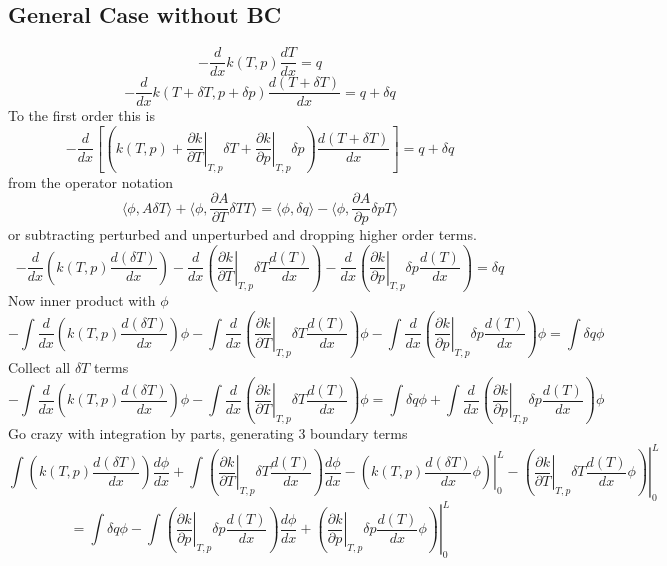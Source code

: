 \documentclass[11pt]{article}
\newcommand{\der}[2]{\frac{\partial #1}{\partial #2}}
\begin{document}
\subsection{General Case without BC}

\[
-\frac{d}{dx}k(T,p)\frac{dT}{dx} = q 
\]
\[
-\frac{d}{dx}k(T+\delta T,p+\delta p)\frac{d(T+\delta T)}{dx} = q +\delta q 
\]
To the first order this is
\[
-\frac{d}{dx}\left[\left(k(T,p)+\left.\frac{\partial k}{\partial T}\right|_{T,p}\delta T+\left.\frac{\partial k}{\partial p}\right|_{T,p}\delta p\right) \frac{d(T+\delta T)}{dx}\right] = q+\delta q \] 
from the operator notation 
\[
\langle \phi , A \delta  T \rangle + \langle \phi, \der{A}{T} \delta T T \rangle = \langle \phi, \delta q \rangle- \langle \phi , \der{A}{p} \delta p T \rangle 
\]
or subtracting perturbed and unperturbed and dropping higher order terms.
\[
-\frac{d}{dx}\left( k(T,p) \frac{d(\delta T)}{dx} \right)
-\frac{d}{dx}\left(\left.\frac{\partial k}{\partial T}\right|_{T,p}\delta T \frac{d(T)}{dx}\right)
-\frac{d}{dx}\left(\left.\frac{\partial k}{\partial p}\right|_{T,p}\delta p \frac{d(T)}{dx} \right)
= \delta q \] 
Now inner product with $\phi$
\[
-\int \frac{d}{dx}\left( k(T,p) \frac{d(\delta T)}{dx} \right)\phi
-\int \frac{d}{dx}\left(\left.\frac{\partial k}{\partial T}\right|_{T,p}\delta T \frac{d(T)}{dx}\right)\phi
-\int \frac{d}{dx}\left(\left.\frac{\partial k}{\partial p}\right|_{T,p}\delta p \frac{d(T)}{dx} \right)\phi
= \int \delta q \phi
\] 
Collect all $\delta T$ terms
\[
-\int \frac{d}{dx}\left( k(T,p) \frac{d(\delta T)}{dx} \right)\phi
-\int \frac{d}{dx}\left(\left.\frac{\partial k}{\partial T}\right|_{T,p}\delta T \frac{d(T)}{dx}\right)\phi
= \int \delta q \phi 
+\int \frac{d}{dx}\left(\left.\frac{\partial k}{\partial p}\right|_{T,p}\delta p \frac{d(T)}{dx} \right)\phi
\] 
Go crazy with integration by parts, generating 3 boundary terms
\[
\int \left( k(T,p) \frac{d(\delta T)}{dx} \right)\frac{d \phi}{dx}
+\int \left(\left.\frac{\partial k}{\partial T}\right|_{T,p}\delta T \frac{d(T)}{dx}\right)\frac{d \phi}{dx} 
- \left. \left( k(T,p) \frac{d(\delta T)}{dx} \phi \right) \right|_0^L 
- \left. \left(\left.\frac{\partial k}{\partial T}\right|_{T,p}\delta T \frac{d(T)}{dx} \phi \right ) \right|_0^L
\]
\[
= \int \delta q \phi 
-\int \left(\left.\frac{\partial k}{\partial p}\right|_{T,p}\delta p \frac{d(T)}{dx} \right)\frac{d \phi}{dx}
+ \left. \left(\left.\frac{\partial k}{\partial p}\right|_{T,p}\delta p \frac{d(T)}{dx} \phi \right) \right|_0^L
\] 
\end{document}
